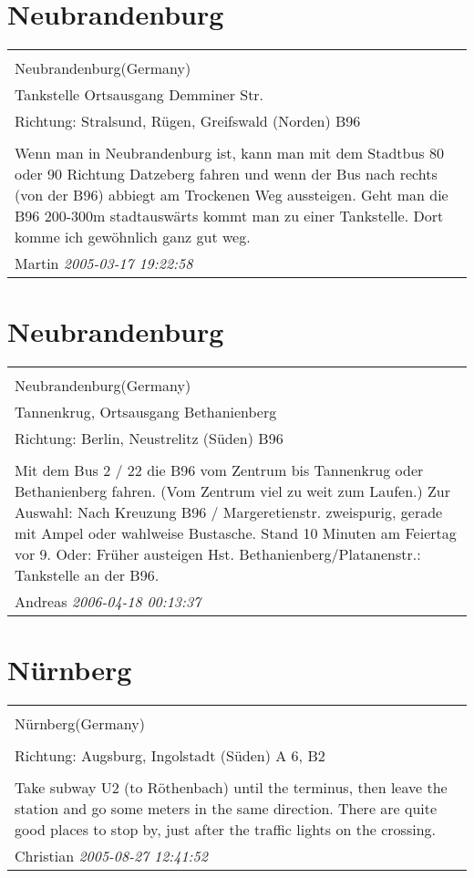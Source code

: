 \documentclass[a4paper,12pt]{article}
\begin{document}
\section{Neubrandenburg}
\begin{tabular}{|p{13cm}|}
\hline\\
Neubrandenburg(Germany)\\
Tankstelle Ortsausgang Demminer Str.\\
Richtung: Stralsund, Rügen, Greifswald (Norden) B96 \\
\hline\\
Wenn man in Neubrandenburg ist, kann man mit dem Stadtbus 80 oder 90 Richtung Datzeberg fahren und wenn der Bus nach rechts (von der B96) abbiegt am Trockenen Weg aussteigen. Geht man die B96 200-300m stadtauswärts kommt man zu einer Tankstelle. Dort komme ich gewöhnlich ganz gut weg. \\
Martin \textit{ 2005-03-17 19:22:58 }\\\hline
\end{tabular}


\section{Neubrandenburg}
\begin{tabular}{|p{13cm}|}
\hline\\
Neubrandenburg(Germany)\\
Tannenkrug, Ortsausgang Bethanienberg\\
Richtung: Berlin, Neustrelitz (Süden) B96 \\
\hline\\
Mit dem Bus 2 / 22 die B96 vom Zentrum bis Tannenkrug oder Bethanienberg fahren. (Vom Zentrum viel zu weit zum Laufen.) Zur Auswahl: Nach Kreuzung B96 / Margeretienstr. zweispurig, gerade mit Ampel oder wahlweise Bustasche. Stand 10 Minuten am Feiertag vor 9. Oder: Früher austeigen Hst. Bethanienberg/Platanenstr.: Tankstelle an der B96. \\
Andreas \textit{ 2006-04-18 00:13:37 }\\\hline
\end{tabular}


\section{Nürnberg}
\begin{tabular}{|p{13cm}|}
\hline\\
Nürnberg(Germany)\\
\\
Richtung: Augsburg, Ingolstadt (Süden) A 6, B2 \\
\hline\\
Take subway U2 (to Röthenbach) until the terminus, then leave the station and go some meters in the same direction. There are quite good places to stop by, just after the traffic lights on the crossing. \\
Christian \textit{ 2005-08-27 12:41:52 }\\\hline
\end{tabular}
\end{document}
